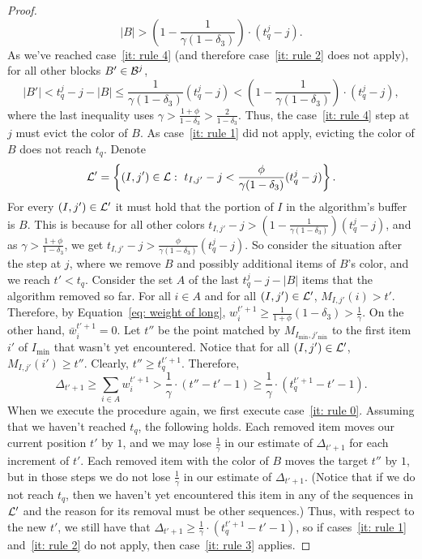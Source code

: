 \documentclass[11pt]{article}
\begin{document}
\begin{proof}
$$
|B| > \left(1 - \frac{1}{\gamma (1 - \delta_3)}\right)\cdot (t^j_q-j).
$$
As we've reached case~\ref{it: rule 4} (and therefore case~\ref{it: rule 2}
does not apply), for all other blocks $B'\in {\cal B}^j$,
$$
|B'| < t^j_q - j - |B|\le \frac{1}{\gamma (1 - \delta_3)} (t^j_q - j)
< \left(1 - \frac{1}{\gamma (1 - \delta_3)}\right)\cdot (t^j_q - j),
$$
where the last inequality uses
$\gamma > \frac{1+\phi}{1 - \delta_3} > \frac{2}{1 - \delta_3}$.
Thus, the case~\ref{it: rule 4} step at $j$ must evict the color of
$B$. As case~\ref{it: rule 1} did not apply, evicting the color
of $B$ does not reach $t_q$. Denote
$$
{\cal L}' = \left\{(I,j')\in {\cal L}:\
   t_{I,j'} - j < \frac{\phi}{\gamma (1 - \delta_3)} (t^j_q - j)\right\}.
$$
For every $(I,j')\in {\cal L}'$ it must hold that the portion of
$I$ in the algorithm's buffer is $B$. This is because for all
other colors
$t_{I,j'} - j > \left(1 - \frac{1}{\gamma (1 - \delta_3)}\right) (t^j_q - j)$,
and as $\gamma > \frac{1+\phi}{1 - \delta_3}$, we get
$t_{I,j'} - j > \frac{\phi}{\gamma (1 - \delta_3)} (t^j_q - j)$.
So consider the situation after the step at $j$, where
we remove $B$ and possibly additional items of $B$'s color,
and we reach $t' < t_q$. Consider the set $A$ of the last
$t^j_q - j - |B|$ items that the algorithm removed so far.
For all $i\in A$ and for all $(I,j')\in {\cal L}'$, $M_{I,j'}(i) > t'$.
Therefore, by Equation~\eqref{eq: weight of long},
$w_i^{t'+1}\ge \frac{1}{1+\phi} (1 - \delta_3) > \frac{1}{\gamma}$.
On the other hand, $\bar{w}_i^{t'+1} = 0$.
Let $t''$ be the point matched by $M_{I_{\min},j'_{\min}}$ to
the first item $i'$ of $I_{\min}$ that wasn't yet encountered.
Notice that for all $(I,j')\in {\cal L}'$, $M_{I,j'}(i')\ge t''$.
Clearly, $t''\ge t^{t'+1}_q$. Therefore,
$$
\Delta_{t'+1} \ge\sum_{i\in A} w_i^{t'+1} >
\frac{1}{\gamma}\cdot (t'' - t' - 1)\ge
\frac{1}{\gamma}\cdot (t^{t'+1}_q - t' - 1).
$$
When we execute the procedure again, we first execute
case~\ref{it: rule 0}. Assuming that we haven't reached $t_q$,
the following holds. Each removed item moves our current
position $t'$ by $1$, and we may lose $\frac{1}{\gamma}$
in our estimate of $\Delta_{t'+1}$ for each increment of $t'$.
Each removed item with the color of $B$ moves the target $t''$
by $1$, but in those steps we do not lose $\frac{1}{\gamma}$
in our estimate of $\Delta_{t'+1}$. (Notice that if we do not
reach $t_q$, then we haven't yet encountered this item in any
of the sequences in ${\cal L}'$ and the reason for its removal
must be other sequences.) Thus, with respect to the new $t'$,
we still have that
$\Delta_{t'+1}\ge \frac{1}{\gamma}\cdot (t^{t'+1}_q - t' - 1)$,
so if cases~\ref{it: rule 1} and~\ref{it: rule 2} do not apply,
then case~\ref{it: rule 3} applies.
\end{proof}
\end{document}
